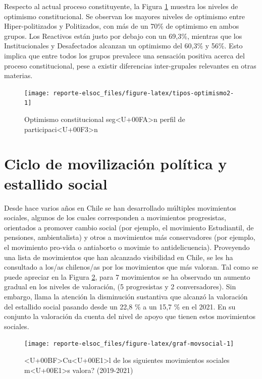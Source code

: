 \documentclass[
  12pt,
]{book}
\begin{document}
Respecto al actual proceso constituyente, la Figura \ref{fig:tipos-optimismo2} muestra los niveles de optimismo constitucional. Se observan los mayores niveles de optimismo entre Hiper-politizados y Politizados, con más de un 70\% de optimismo en ambos grupos. Los Reactivos están justo por debajo con un 69,3\%, mientras que los Institucionales y Desafectados alcanzan un optimismo del 60,3\% y 56\%. Esto implica que entre todos los grupos prevalece una sensación positiva acerca del proceso constitucional, pese a existir diferencias inter-grupales relevantes en otras materias.

\begin{figure}

{\centering \texttt{[image: reporte-elsoc\_files/figure-latex/tipos-optimismo2-1]} 

}

\caption{Optimismo constitucional seg<U+00FA>n perfil de participaci<U+00F3>n}\label{fig:tipos-optimismo2}
\end{figure}

\hypertarget{ciclo-de-movilizaciuxf3n-poluxedtica-y-estallido-social}{%
\section{Ciclo de movilización política y estallido social}\label{ciclo-de-movilizaciuxf3n-poluxedtica-y-estallido-social}}

Desde hace varios años en Chile se han desarrollado múltiples movimientos sociales, algunos de los cuales corresponden a movimientos progresistas, orientados a promover cambio social (por ejemplo, el movimiento Estudiantil, de pensiones, ambientalista) y otros a movimientos más conservadores (por ejemplo, el movimiento pro-vida o antiaborto o movimie to antidelicuencia). Proveyendo una lista de movimientos que han alcanzado visibilidad en Chile, se les ha consultado a los/as chilenos/as por los movimientos que más valoran. Tal como se puede apreciar en la Figura \ref{fig:graf-movsocial}, para 7 movimientos se ha observado un aumento gradual en los niveles de valoración, (5 progresistas y 2 conversadores). Sin embargo, llama la atención la disminución sustantiva que alcanzó la valoración del estallido social pasando desde un 22,8 \% a un 15,7 \% en el 2021. En su conjunto la valoración da cuenta del nivel de apoyo que tienen estos movimientos sociales.

\begin{figure}

{\centering \texttt{[image: reporte-elsoc\_files/figure-latex/graf-movsocial-1]} 

}

\caption{<U+00BF>Cu<U+00E1>l de los siguientes movimientos sociales m<U+00E1>s valora? (2019-2021)}\label{fig:graf-movsocial}
\end{figure}
\end{document}
